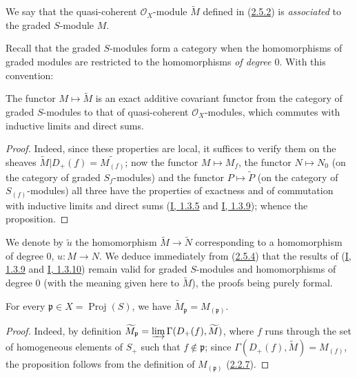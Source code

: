 \begin{definition}[2.5.3]
\label{II.2.5.3}
We say that the quasi-coherent $\mathcal{O}_X$-module $\widetilde{M}$
defined in (\hyperref[II.2.5.2]{2.5.2}) is \emph{associated} to the
graded $S$-module $M$.
\end{definition}

Recall that the graded $S$-modules form a category when the
homomorphisms of graded modules are restricted to the homomorphisms
\emph{of degree $0$}. With this convention:

\begin{proposition}[2.5.4]
\label{II.2.5.4}
The functor $M\mapsto\widetilde{M}$ is an exact additive covariant functor
from the category of graded $S$-modules to that of quasi-coherent
$\mathcal{O}_X$-modules, which commutes with inductive limits and direct
sums.
\end{proposition}

\begin{proof}
Indeed, since these properties are local, it suffices to verify them on
the sheaves
$\widetilde{M}|D_+(f)=\widetilde{M_{(f)}}$; now the functor
$M\mapsto M_f$, the functor $N\mapsto N_0$ (on the category of graded
$S_f$-modules) and the functor $P\mapsto\widetilde{P}$ (on the
category of $S_{(f)}$-modules) all three have the properties of exactness
and of commutation with inductive limits and direct sums
(\hyperref[I.1.3.5]{I, 1.3.5} and
\hyperref[I.1.3.9]{I, 1.3.9}); whence the proposition.
\end{proof}

We denote by $\widetilde{u}$ the homomorphism
$\widetilde{M}\to\widetilde{N}$ corresponding to a homomorphism of degree
$0$, $u:M\to N$. We deduce immediately from
(\hyperref[II.2.5.4]{2.5.4}) that the results of
(\hyperref[I.1.3.9]{I, 1.3.9} and
\hyperref[I.1.3.10]{I, 1.3.10}) remain valid for graded
$S$-modules and homomorphisms of degree $0$ (with the meaning given
here to $\widetilde{M}$), the proofs being purely formal.

\begin{proposition}[2.5.5]
\label{II.2.5.5}
For every $\mathfrak{p}\in X=\operatorname{Proj}(S)$, we have
$\widetilde{M}_{\mathfrak{p}}=M_{(\mathfrak{p})}$.
\end{proposition}

\begin{proof}
Indeed, by definition
$\widetilde{M}_{\mathfrak{p}}=
\varinjlim\Gamma(D_+(f),\widetilde{M})$, where $f$ runs through the set of
homogeneous elements of $S_+$ such that $f\notin\mathfrak{p}$; since
$\Gamma(D_+(f),\widetilde{M})=M_{(f)}$, the proposition follows from the
definition of $M_{(\mathfrak{p})}$
(\hyperref[II.2.2.7]{2.2.7}).
\end{proof}

